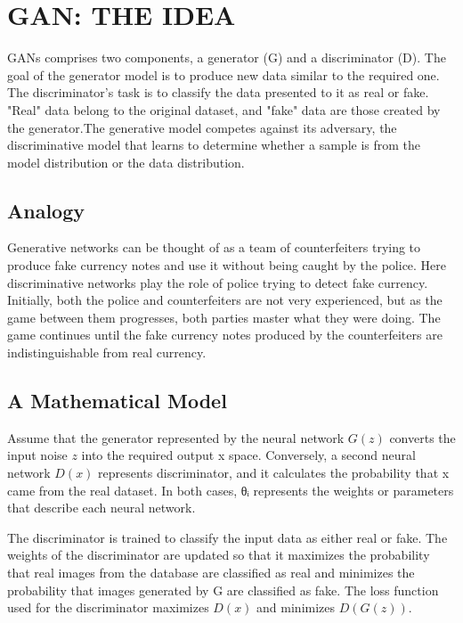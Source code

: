 \chapter{GAN: THE IDEA}
\begin{onehalfspace}
    GANs comprises two components, a generator (G) and a discriminator (D). 
    The goal of the generator model is to produce new data similar to the required 
    one. The discriminator's task is to classify the data presented to it as real or 
    fake. "Real" data belong to the original dataset, and "fake" data are those 
    created by the generator.The generative model competes against its adversary, 
    the discriminative model that learns to determine whether a sample is from the 
    model distribution or the data distribution.    
\section{Analogy}
    Generative networks can be thought of as a team of counterfeiters trying 
    to produce fake currency notes and use it without being caught by the 
    police. Here discriminative networks play the role of police trying to 
    detect fake currency. Initially, both the police and counterfeiters are not 
    very experienced, but as the game between them progresses, both parties 
    master what they were doing.  The game continues until the fake currency 
    notes produced by the counterfeiters are indistinguishable from real 
    currency.

\section{A Mathematical Model}

    Assume that the generator represented by the neural network \(G(z)\) converts 
    the input noise \(z\) into the required output x space. Conversely, a second 
    neural network \(D(x)\) represents discriminator, and it calculates the 
    probability that x came from the real dataset. In both cases, θᵢ represents 
    the weights or parameters that describe each neural network.

    The discriminator is trained to classify the input data as either real or 
    fake. The weights of the discriminator are updated so that it maximizes the 
    probability that real images from the database are classified as real and 
    minimizes the probability that images generated by G are classified as fake. 
    The loss function used for the discriminator maximizes \(D(x)\) and minimizes 
    \(D(G(z))\). 


\end{onehalfspace}
